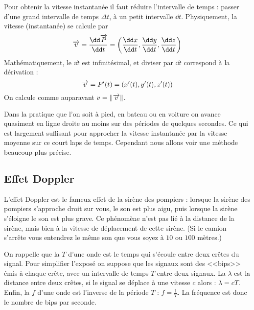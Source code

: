 \documentclass[class=report,crop=false]{standalone}
\begin{document}

Pour obtenir la vitesse instantanée il faut réduire l'intervalle de temps : 
passer d'une grand intervalle de temps $\Delta t$, à un petit intervalle 
$\dd t$.
Physiquement, la vitesse (instantanée) se calcule par 
$$\vect v = \frac{\dd \vect P}{\dd t} = \left(\frac{\dd x}{\dd t},\frac{\dd y}{\dd t},\frac{\dd z}{\dd t} \right)$$
Mathématiquement, le $\dd t$ est infinitésimal, et diviser par $\dd t$ correspond 
à la dérivation :
$$\overrightarrow v = P'(t) = \left( x'(t), y'(t), z'(t) \right)$$
On calcule comme auparavant $v = \| \overrightarrow v\|$.

Dans la pratique que l'on soit à pied, en bateau ou en voiture on avance
quasiment en ligne droite au moins sur des périodes de quelques secondes.
Ce qui est largement suffisant pour approcher la vitesse instantanée par
la vitesse moyenne sur ce court laps de temps.
Cependant nous allons voir une méthode beaucoup plus précise.



\subsection{Effet Doppler}

L'effet Doppler est le fameux effet de la sirène des pompiers :
lorsque la sirène des pompiers s'approche droit sur vous, le son est plus aigu, 
puis lorsque la sirène s'éloigne le son est plus grave. Ce phénomène n'est pas lié à la distance
de la sirène, mais bien à la vitesse de déplacement de cette sirène.
(Si le camion s'arrête vous entendrez le même son que vous soyez à
$10$ ou $100$ mètres.)


\bigskip

On rappelle que la  $T$ d'une onde est le temps qui s'écoule entre 
deux crêtes du signal. Pour simplifier l'exposé on suppose que les signaux sont
des <<bips>> émis à chaque crête, avec un intervalle de temps $T$ entre deux signaux.
La  $\lambda$ est la distance entre deux crêtes, 
si le signal se déplace à une vitesse $c$ alors : $\lambda = c T$.
Enfin, la  $f$ d'une onde est l'inverse de la période $T$ : $f = \frac{1}{T}$.
La fréquence est donc le nombre de bips par seconde. 
\end{document}
